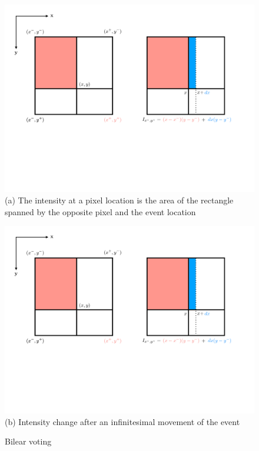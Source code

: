 \begin{figure}
  \begin{minipage}[t]{0.48\textwidth}
    \centering \includegraphics[trim={1cm 7cm 18cm 1cm},clip,width =
    \textwidth]{images/bi_voting.pdf} (a) The intensity at a pixel
    location is the area of the rectangle spanned by the opposite
    pixel and the event location
  \end{minipage}
  \hfill
  \begin{minipage}[t]{0.48\textwidth}
    \centering \includegraphics[trim={18cm 7cm 1cm 1cm},clip,width =
    \textwidth]{images/bi_voting.pdf} (b) Intensity change after an
    infinitesimal movement of the event
  \end{minipage}
  \caption{Bilear voting}
  \label{fig:bi_voting}
\end{figure}
